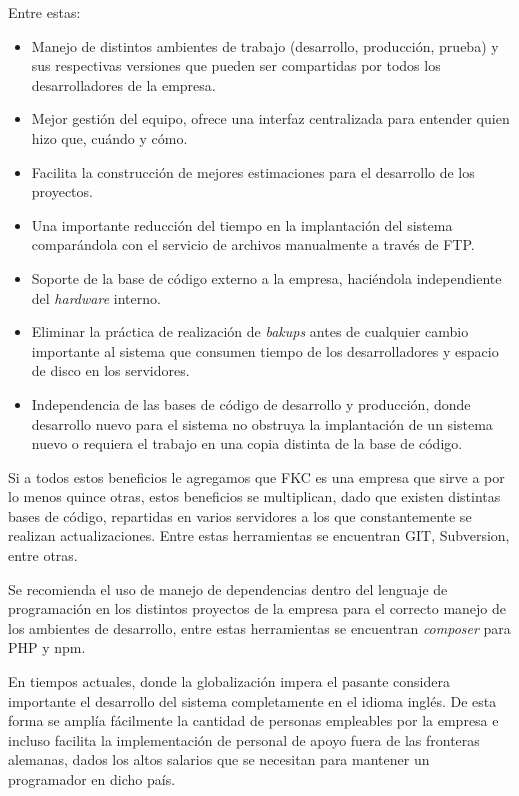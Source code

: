 Entre estas:

\begin{itemize}
	\item Manejo de distintos ambientes de trabajo (desarrollo, producción, prueba) y sus respectivas versiones que pueden ser compartidas por todos los desarrolladores de la empresa.
	
	\item Mejor gestión del equipo, ofrece una interfaz centralizada para entender quien hizo que, cuándo y cómo.

	\item Facilita la construcción de mejores estimaciones para el desarrollo de los proyectos.

	\item Una importante reducción del tiempo en la implantación del sistema comparándola con el servicio de archivos manualmente a través de FTP.

	\item Soporte de la base de código externo a la empresa, haciéndola independiente del \emph{hardware} interno.

	\item Eliminar la práctica de realización de \emph{bakups} antes de cualquier cambio importante al sistema que consumen tiempo de los desarrolladores y espacio de disco en los servidores.

	\item Independencia de las bases de código de desarrollo y producción, donde desarrollo nuevo para el sistema no obstruya la implantación de un sistema nuevo o requiera el trabajo en una copia distinta de la base de código.
\end{itemize}

Si a todos estos beneficios le agregamos que FKC es una empresa que sirve a por lo menos quince otras, estos beneficios se multiplican, dado que existen distintas bases de código, repartidas en varios servidores a los que constantemente se realizan actualizaciones. Entre estas herramientas se encuentran GIT, Subversion, entre otras.

Se recomienda el uso de manejo de dependencias dentro del lenguaje de programación en los distintos proyectos de la empresa para el correcto manejo de los ambientes de desarrollo, entre estas herramientas se encuentran \emph{composer} para PHP y npm. 

En tiempos actuales, donde la globalización impera el pasante considera importante el desarrollo del sistema completamente en el idioma inglés. De esta forma se amplía fácilmente la cantidad de personas empleables por la empresa e incluso facilita la implementación de personal de apoyo fuera de las fronteras alemanas, dados los altos salarios que se necesitan para mantener un programador en dicho país.

